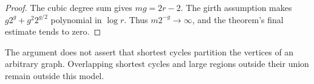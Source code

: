\begin{proof}
The cubic degree sum gives $mg=2r-2$.
The girth assumption makes $g2^g+g^2 2^{g/2}$ polynomial in $\log r$.
Thus $m2^{-g}\to\infty$, and the theorem's final estimate tends to zero.
\end{proof}

The argument does not assert that shortest cycles partition the vertices of an arbitrary graph.
Overlapping shortest cycles and large regions outside their union remain outside this model.

